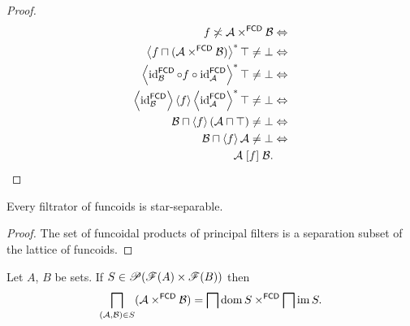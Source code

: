 \begin{proof}
~
\begin{align*}
f\not\asymp\mathcal{A}\times^{\mathsf{FCD}}\mathcal{B} & \Leftrightarrow\\
\left\langle f\sqcap(\mathcal{A}\times^{\mathsf{FCD}}\mathcal{B})\right\rangle ^{\ast}\top\ne\bot & \Leftrightarrow\\
\left\langle \operatorname{id}_{\mathcal{B}}^{\mathsf{FCD}}\circ
f\circ\operatorname{id}_{\mathcal{A}}^{\mathsf{FCD}}\right\rangle ^{\ast}\top\ne\bot & \Leftrightarrow\\
\left\langle \operatorname{id}_{\mathcal{B}}^{\mathsf{FCD}}\right\rangle\left\langle f\right\rangle\left\langle \operatorname{id}_{\mathcal{A}}^{\mathsf{FCD}}\right\rangle ^{\ast}\top\ne\bot & \Leftrightarrow\\
\mathcal{B}\sqcap\left\langle f\right\rangle(\mathcal{A}\sqcap\top)\ne\bot & \Leftrightarrow\\
\mathcal{B}\sqcap\left\langle f\right\rangle\mathcal{A}\ne\bot &
\Leftrightarrow\\
\mathcal{A}\mathrel{\left[f\right]}\mathcal{B}.
\end{align*}
\end{proof}
\begin{cor}
Every filtrator of funcoids is star-separable.\end{cor}
\begin{proof}
The set of funcoidal products of principal filters is a separation
subset of the lattice of funcoids.\end{proof}
\begin{thm}
\label{meet-prod-fcd}Let $A$, $B$ be sets. If
$S\in\mathscr{P}(\mathscr{F}(A)\times\mathscr{F}(B))$
then
\[
\bigsqcap_{(\mathcal{A},\mathcal{B})\in
S}(\mathcal{A}\times^{\mathsf{FCD}}\mathcal{B})=\bigsqcap\operatorname{dom}
S\times^{\mathsf{FCD}}\bigsqcap\operatorname{im} S.
\]
\end{thm}
